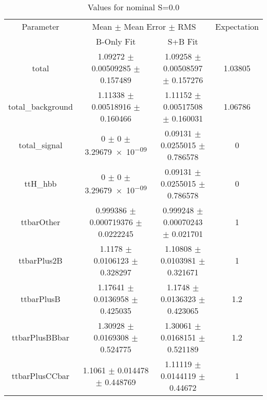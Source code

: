 \begin{table}
\centering
\caption{Values for nominal S=0.0}
\begin{tabular}{cccc}
\toprule
Parameter & \multicolumn{2}{c}{Mean $\pm$ Mean Error $\pm$ RMS} & Expectation\\
 & B-Only Fit & S+B Fit & \\
\midrule
total & \num{1.09272} $\pm$ \num{0.00509285} $\pm$ \num{0.157489} & \num{1.09258} $\pm$ \num{0.00508597} $\pm$ \num{0.157276} & \num{1.03805}\\
total\_background & \num{1.11338} $\pm$ \num{0.00518916} $\pm$ \num{0.160466} & \num{1.11152} $\pm$ \num{0.00517508} $\pm$ \num{0.160031} & \num{1.06786}\\
total\_signal & \num{0} $\pm$ \num{0} $\pm$ \num{3.29679e-09} & \num{0.09131} $\pm$ \num{0.0255015} $\pm$ \num{0.786578} & \num{0}\\
ttH\_hbb & \num{0} $\pm$ \num{0} $\pm$ \num{3.29679e-09} & \num{0.09131} $\pm$ \num{0.0255015} $\pm$ \num{0.786578} & \num{0}\\
ttbarOther & \num{0.999386} $\pm$ \num{0.000719376} $\pm$ \num{0.0222245} & \num{0.999248} $\pm$ \num{0.00070243} $\pm$ \num{0.021701} & \num{1}\\
ttbarPlus2B & \num{1.1178} $\pm$ \num{0.0106123} $\pm$ \num{0.328297} & \num{1.10808} $\pm$ \num{0.0103981} $\pm$ \num{0.321671} & \num{1}\\
ttbarPlusB & \num{1.17641} $\pm$ \num{0.0136958} $\pm$ \num{0.425035} & \num{1.1748} $\pm$ \num{0.0136323} $\pm$ \num{0.423065} & \num{1.2}\\
ttbarPlusBBbar & \num{1.30928} $\pm$ \num{0.0169308} $\pm$ \num{0.524775} & \num{1.30061} $\pm$ \num{0.0168151} $\pm$ \num{0.521189} & \num{1.2}\\
ttbarPlusCCbar & \num{1.1061} $\pm$ \num{0.014478} $\pm$ \num{0.448769} & \num{1.11119} $\pm$ \num{0.0144119} $\pm$ \num{0.44672} & \num{1}\\
\bottomrule
\end{tabular}
\end{table}